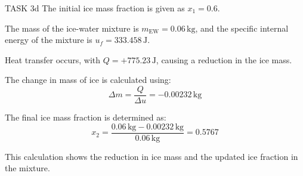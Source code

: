 TASK 3d  
The initial ice mass fraction is given as \( x_1 = 0.6 \).  

The mass of the ice-water mixture is \( m_{\text{EW}} = 0.06 \, \text{kg} \), and the specific internal energy of the mixture is \( u_f = 333.458 \, \text{J} \).  

Heat transfer occurs, with \( Q = +775.23 \, \text{J} \), causing a reduction in the ice mass.  

The change in mass of ice is calculated using:  
\[
\Delta m = \frac{Q}{\Delta u} = -0.00232 \, \text{kg}
\]  

The final ice mass fraction is determined as:  
\[
x_2 = \frac{0.06 \, \text{kg} - 0.00232 \, \text{kg}}{0.06 \, \text{kg}} = 0.5767
\]  

This calculation shows the reduction in ice mass and the updated ice fraction in the mixture.
